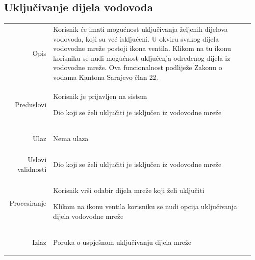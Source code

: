 \documentclass[]{report}
\begin{document}
\subsection{Uključivanje dijela vodovoda}
\begin{tabular}{rp{}}
Opis & 
\hspace{12pt} Korisnik će imati mogućnost uključivanja željenih dijelova vodovoda, koji su već isključeni. U okviru svakog dijela vodovodne mreže postoji ikona ventila. Klikom na tu ikonu korisniku se nudi mogućnost uključenja određenog dijela iz vodovodne mreže. Ova funcionalnost podliježe Zakonu o vodama Kantona Sarajevo član 22.

\\
Preduslovi & 
\begin{compactitem}
    \item Korisnik je prijavljen na sistem
    \item Dio koji se želi uključiti je isključen iz vodovodne mreže
\end{compactitem}

\\
Ulaz & 

\begin{compactitem} 
      \item Nema ulaza
    \end{compactitem}

\\
Uslovi validnosti &

\begin{compactitem} 
   \item  Dio koji se želi uključiti je isključen iz vodovodne mreže
\end{compactitem}

\\
Procesiranje &

\begin{compactitem} 
    \item Korisnik vrši odabir dijela mreže koji želi uključiti
    \item Klikom na ikonu ventila korisniku se nudi opcija uključivanja dijela vodovodne mreže

\end{compactitem}

\\
Izlaz &

\begin{compactitem} 
    \item Poruka o uspješnom uključivanju dijela mreže
\end{compactitem}


\end{tabular}
\end{document}
